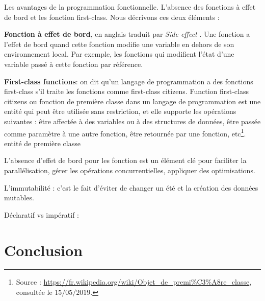 Les avantages de la  programmation fonctionnelle. L'absence des fonctions à effet de bord et les fonction first-class. Nous décrivons ces deux éléments :
\begin{tcolorbox}
	\textbf{Fonction à effet de bord}, en anglais traduit par \textit{Side effect} . Une fonction a l'effet de bord quand cette fonction modifie une variable en dehors de son environnement local. Par exemple, les fonctions qui modifient l'état d'une variable passé à cette fonction par référence.
	
	\textbf{First-class functions}: on dit qu'un langage de programmation a des fonctions first-class s'il traite les fonctions comme first-class citizens.  Function first-class citizens ou fonction de première classe dans un langage de programmation est une entité qui peut être utilisée sans restriction, et elle supporte les opérations suivantes : être affectée à des variables ou  à des structures de données, être passée comme paramètre à une autre fonction, être retournée par une fonction, etc\footnote{Source : \url{https://fr.wikipedia.org/wiki/Objet\_de\_premi\%C3\%A8re_classe}, consultée le $15/05/2019$.}.
	entité de première classe
\end{tcolorbox}

L'absence d'effet de bord pour les fonction est un élément clé pour faciliter la parallélisation, gérer les opérations concurrentielles, appliquer des optimisations.

L'immutabilité : c'est le fait d'éviter de changer un été et la création des données mutables.

Déclaratif vs impératif : 
\section{Conclusion}